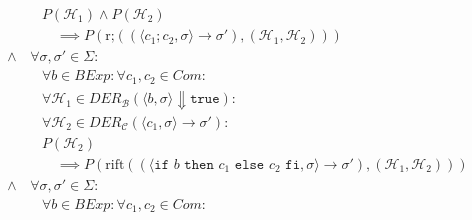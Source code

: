 \begin{align*}
						                  & \quad P(\mathcal{H} _ 1) \land P(\mathcal{H} _ 2)                                                                                                                                                                          \\
						                  & \quad\quad \implies P(\text{r;}((\langle c _ 1 ; c _ 2, \sigma \rangle \rightarrow \sigma'), (\mathcal{H} _ 1, \mathcal{H} _ 2)))                                                                                          \\
						\land             & \,\forall \sigma, \sigma' \in \Sigma :                                                                                                                                                                                     \\
						                  & \quad \forall b \in \textit{BExp} : \forall c _ 1, c _ 2 \in \textit{Com} :                                                                                                                                                \\
						                  & \quad \forall \mathcal{H} _ 1 \in \textit{DER} _ \mathcal{B} (\langle b, \sigma \rangle \Downarrow \texttt{true}) :                                                                                                        \\
						                  & \quad \forall \mathcal{H} _ 2 \in \textit{DER} _ \mathcal{C} (\langle c _ 1, \sigma \rangle \rightarrow \sigma') :                                                                                                         \\
						                  & \quad P(\mathcal{H} _ 2)                                                                                                                                                                                                   \\
						                  & \quad\quad \implies P(\text{rift}((\langle \texttt{if } b \texttt{ then } c _ 1 \texttt{ else } c _ 2 \texttt{ fi}, \sigma \rangle \rightarrow \sigma'), (\mathcal{H} _ 1, \mathcal{H} _ 2)))                              \\
						\land             & \,\forall \sigma, \sigma' \in \Sigma :                                                                                                                                                                                     \\
						                  & \quad \forall b \in \textit{BExp} : \forall c _ 1, c _ 2 \in \textit{Com} :                                                                                                                                                \\

\end{align*}
